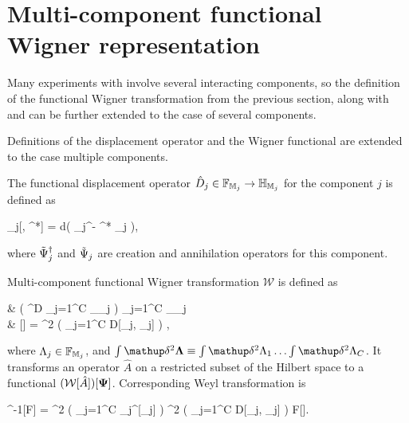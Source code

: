 \section{Multi-component functional Wigner representation}

Many experiments with  involve several interacting components, so the definition of the functional Wigner transformation from the previous section, along with  and  can be further extended to the case of several components.

Definitions of the displacement operator and the Wigner functional are extended to the case multiple components.

\begin{definition}
	The functional displacement operator $\hat{D}_j \in \mathbb{F}_{\mathbb{M}_j} \rightarrow \mathbb{H}_{\mathbb{M}_j}$ for the component $j$ is defined as
	\begin{eqn*}
		_j[\Lambda, \Lambda^*] = \exp \int d\xvec \left(
			\Lambda \Psiop_j^\dagger - \Lambda^* \Psiop_j
		\right),
	\end{eqn*}
	where $\tilde{\Psi}_j^\dagger$ and $\tilde{\Psi}_j$ are creation and annihilation operators for this component.
\end{definition}

\begin{definition}
\label{def:wigner:mc:w-transformation}
	Multi-component functional Wigner transformation $\mathcal{W}$ is defined as
	\begin{eqn*}
		&  \in \left( ^D \rightarrow \prod_{j=1}^C _{\restbasis_j} \right)
			\rightarrow \prod_{j=1}^C _{\restbasis_j}
			\rightarrow \mathbb{C} \\
		& [\hat{A}]
		=  \int \fdelta^2 \bLambda
			\left( \prod_{j=1}^C D[\Lambda_j, \Psi_j] \right)
			\Trace{ \hat{A} \prod_{j=1}^C \hat{D}_j[\Lambda_j] },
	\end{eqn*}
	where $\Lambda_j \in \mathbb{F}_{\mathbb{M}_j}$, and $\int \fdelta^2 \bLambda \equiv \int \fdelta^2 \Lambda_1 \ldots \int \fdelta^2 \Lambda_C$.
	It transforms an operator $\hat{A}$ on a restricted subset of the Hilbert space to a functional $(\mathcal{W}[\hat{A}])[\mathbf{\Psi}]$.
	Corresponding Weyl transformation is
	\begin{eqn*}
		^{-1}[F]
		=  \int \fdelta^2 \bXi
			\left( \prod_{j=1}^C _j^{\dagger}[\Xi_j] \right)
			\int \fdelta^2 \bPhi
				\left( \prod_{j=1}^C D[\Phi_j, \Xi_j] \right)
				F[\bPhi].
	\end{eqn*}
\end{definition}

